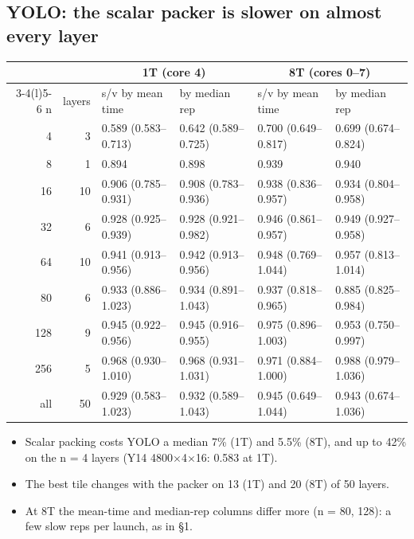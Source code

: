\subsection{YOLO: the scalar packer is slower on almost every layer}
\begin{center}\small
\begin{tabular}{@{}rr ll ll@{}}
\toprule
 & & \multicolumn{2}{c}{1T (core 4)} & \multicolumn{2}{c}{8T (cores 0--7)} \\
\cmidrule(lr){3-4}\cmidrule(l){5-6}
n & layers & s/v by mean time & by median rep & s/v by mean time & by median rep \\
\midrule
4 & 3 & 0.589 (0.583--0.713) & 0.642 (0.589--0.725) & 0.700 (0.649--0.817) & 0.699 (0.674--0.824) \\
8 & 1 & 0.894 & 0.898 & 0.939 & 0.940 \\
16 & 10 & 0.906 (0.785--0.931) & 0.908 (0.783--0.936) & 0.938 (0.836--0.957) & 0.934 (0.804--0.958) \\
32 & 6 & 0.928 (0.925--0.939) & 0.928 (0.921--0.982) & 0.946 (0.861--0.957) & 0.949 (0.927--0.958) \\
64 & 10 & 0.941 (0.913--0.956) & 0.942 (0.913--0.956) & 0.948 (0.769--1.044) & 0.957 (0.813--1.014) \\
80 & 6 & 0.933 (0.886--1.023) & 0.934 (0.891--1.043) & 0.937 (0.818--0.965) & 0.885 (0.825--0.984) \\
128 & 9 & 0.945 (0.922--0.956) & 0.945 (0.916--0.955) & 0.975 (0.896--1.003) & 0.953 (0.750--0.997) \\
256 & 5 & 0.968 (0.930--1.010) & 0.968 (0.931--1.031) & 0.971 (0.884--1.000) & 0.988 (0.979--1.036) \\
\midrule
all & 50 & 0.929 (0.583--1.023) & 0.932 (0.589--1.043) & 0.945 (0.649--1.044) & 0.943 (0.674--1.036) \\
\bottomrule
\end{tabular}
\end{center}

\begin{itemize}\setlength\itemsep{1pt}
\item Scalar packing costs YOLO a median 7\% (1T) and 5.5\% (8T), and up to 42\% on the n = 4 layers (Y14 4800$\times$4$\times$16: 0.583 at 1T).
\item The best tile changes with the packer on 13 (1T) and 20 (8T) of 50 layers.
\item At 8T the mean-time and median-rep columns differ more (n = 80, 128): a few slow reps per launch, as in \S1.
\end{itemize}

